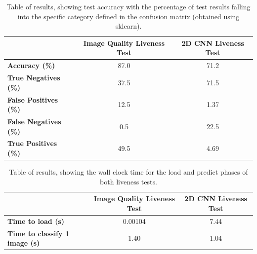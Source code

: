 \documentclass[12pt,a4paper]{article}
\begin{document}
    \begin{table}[ht]
        \centering
        \begin{tabular}[t]{lcc}
            \toprule
             & \textbf{Image Quality Liveness Test} & \textbf{2D CNN Liveness Test}\\
             \midrule
            \textbf{Accuracy (\%)} & 87.0 & 71.2\\
            \midrule
            \textbf{True Negatives (\%)} & 37.5 & 71.5\\
            \textbf{False Positives (\%)} & 12.5 & 1.37\\
            \textbf{False Negatives (\%)} & 0.5 & 22.5\\
            \textbf{True Positives (\%)} & 49.5 & 4.69\\
            \bottomrule
        \end{tabular}
        \caption{Table of results, showing test accuracy with the percentage of test results falling into the specific category defined in the confusion matrix (obtained using sklearn).}
        \label{ResultsTable}
    \end{table}

    \begin{table}[ht]
        \centering
        \begin{tabular}[t]{lcc}
            \toprule
             & \textbf{Image Quality Liveness Test} & \textbf{2D CNN Liveness Test}\\
             \midrule
            \textbf{Time to load (s)} & 0.00104 & 7.44\\
            \textbf{Time to classify 1 image (s)} & 1.40 & 1.04\\
            \bottomrule
        \end{tabular}
        \caption{Table of results, showing the wall clock time for the load and predict phases of both liveness tests.}
        \label{WallClockResultsTime}
    \end{table}
\end{document}
